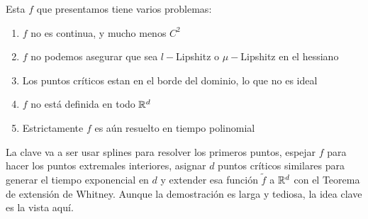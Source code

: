 \begin{remark}
	Esta $f$ que presentamos tiene varios problemas:
	
	\begin{enumerate}
		\item $f$ no es continua, y mucho menos $C^2$
		\item $f$ no podemos asegurar que sea $l-$Lipshitz o $\mu-$Lipshitz en el hessiano
		\item Los puntos cr\'iticos estan en el borde del dominio, lo que no es ideal
		\item $f$ no est\'a definida en todo ${\mathbb{R}}^d$
		\item Estrictamente $f$ es a\'un resuelto en tiempo polinomial
	\end{enumerate}
	
	La clave va a ser usar splines para resolver los primeros puntos, espejar $f$ para hacer los puntos extremales interiores, asignar $d$ puntos cr\'iticos similares para generar el tiempo exponencial en $d$ y extender esa funci\'on $\tilde{f}$ a ${\mathbb{R}}^d$ con el Teorema de extensi\'on de Whitney. Aunque la demostraci\'on es larga y tediosa, la idea clave es la vista aqu\'i.
\end{remark}


